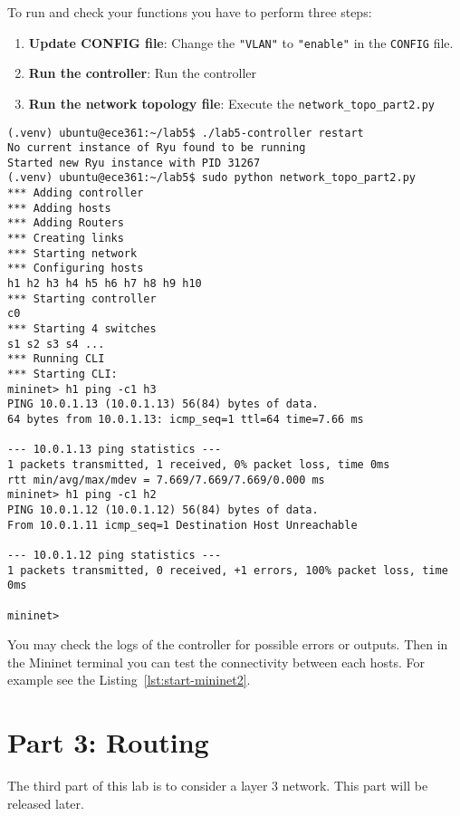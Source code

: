 \documentclass[11pt]{article}
\begin{document}
To run and check your functions you have to perform three steps:
\begin{enumerate}
    \item \textbf{Update CONFIG file}: Change the \texttt{"VLAN"} to \texttt{"enable"} in the \texttt{CONFIG} file.
    \item \textbf{Run the controller}: Run the controller
    \item \textbf{Run the network topology file}: Execute the \texttt{network\_topo\_part2.py}
\end{enumerate}


\begin{lstlisting}[style=ece361shell, caption={Create the network topology for first part}, label={lst:start-mininet2}]
(.venv) ubuntu@ece361:~/lab5$ ./lab5-controller restart
No current instance of Ryu found to be running
Started new Ryu instance with PID 31267
(.venv) ubuntu@ece361:~/lab5$ sudo python network_topo_part2.py 
*** Adding controller
*** Adding hosts
*** Adding Routers
*** Creating links
*** Starting network
*** Configuring hosts
h1 h2 h3 h4 h5 h6 h7 h8 h9 h10 
*** Starting controller
c0 
*** Starting 4 switches
s1 s2 s3 s4 ...
*** Running CLI
*** Starting CLI:
mininet> h1 ping -c1 h3
PING 10.0.1.13 (10.0.1.13) 56(84) bytes of data.
64 bytes from 10.0.1.13: icmp_seq=1 ttl=64 time=7.66 ms

--- 10.0.1.13 ping statistics ---
1 packets transmitted, 1 received, 0% packet loss, time 0ms
rtt min/avg/max/mdev = 7.669/7.669/7.669/0.000 ms
mininet> h1 ping -c1 h2
PING 10.0.1.12 (10.0.1.12) 56(84) bytes of data.
From 10.0.1.11 icmp_seq=1 Destination Host Unreachable

--- 10.0.1.12 ping statistics ---
1 packets transmitted, 0 received, +1 errors, 100% packet loss, time 0ms

mininet> 
\end{lstlisting}

You may check the logs of the controller for possible errors or outputs. Then in the Mininet terminal you can test the connectivity between each hosts. For example see the Listing~\ref{lst:start-mininet2}. 



\section{Part 3: Routing}
\label{sec:exercise3}
The third part of this lab is to consider a layer 3 network. This part will be released later.
\end{document}
